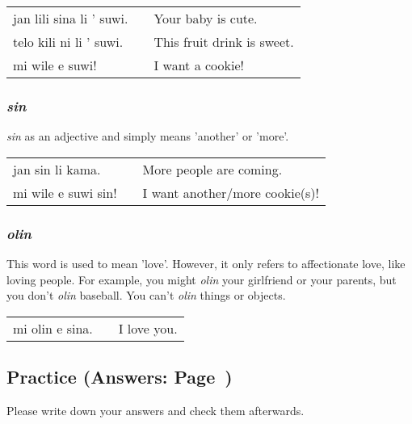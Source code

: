 \begin{supertabular}{p{5,5cm}|ll}
jan lili sina li ' suwi. && Your baby is cute. \\
telo kili ni li ' suwi. && This fruit drink is sweet. \\
mi wile e suwi! && I want a cookie! \\
\end{supertabular} 

%
\subsubsection*{\textit{sin}}
%
\textit{sin} as an adjective and simply means 'another' or 'more'. 

\begin{supertabular}{p{5,5cm}|ll}
jan sin li kama. && More people are coming. \\
mi wile e suwi sin! && I want another/more cookie(s)! \\
\end{supertabular} 

%
\subsubsection*{\textit{olin}}
%
This word is used to mean 'love'. 
However, it only refers to affectionate love, like loving people. 
For example, you might \textit{olin} your girlfriend or your parents, but you don't \textit{olin} baseball. 
You can't \textit{olin} things or objects. 

\begin{supertabular}{p{5,5cm}|ll}
mi olin e sina. && I love you. \\
\end{supertabular}  

%
%
\newpage
\subsection*{Practice (Answers: Page~\pageref{'questions_using_seme'})}
%
Please write down your answers and check them afterwards. 


